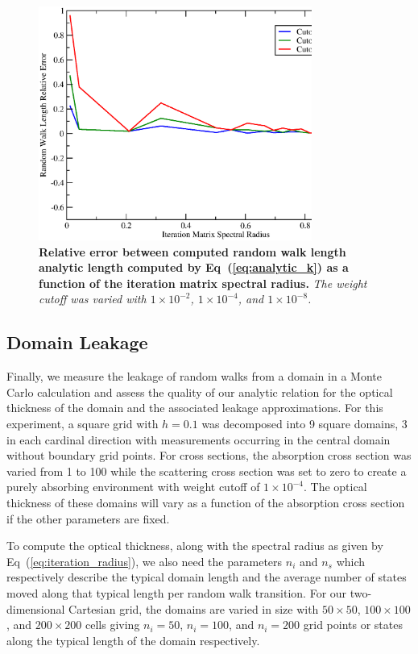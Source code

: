 \documentclass[preprint,11pt]{elsarticle}
\newcommand{\sn}[2]{\ensuremath{#1\times 10^{#2}}}
\begin{document}
\begin{figure}[ht!]
  \begin{center}
    \includegraphics[width=0.8\textwidth]{random_walk_error.eps}
  \end{center}
  \caption{\textbf{Relative error between computed random walk length analytic
      length computed by Eq~(\ref{eq:analytic_k}) as a function of the
      iteration matrix spectral radius.} \textit{The weight cutoff was varied
      with \sn{1}{-2}, \sn{1}{-4}, and \sn{1}{-8}.}}
  \label{fig:measured_length_error}
\end{figure}

\subsection{Domain Leakage}
\label{subsec:domain_leakage}

Finally, we measure the leakage of random walks from a domain in a Monte Carlo
calculation and assess the quality of our analytic relation for the optical
thickness of the domain and the associated leakage approximations. For this
experiment, a square grid with $h=0.1$ was decomposed into 9 square domains, 3
in each cardinal direction with measurements occurring in the central domain
without boundary grid points. For cross sections, the absorption cross section
was varied from 1 to 100 while the scattering cross section was set to zero to
create a purely absorbing environment with weight cutoff of \sn{1}{-4}. The
optical thickness of these domains will vary as a function of the absorption
cross section if the other parameters are fixed.

To compute the optical thickness, along with the spectral radius as given by
Eq~(\ref{eq:iteration_radius}), we also need the parameters $n_i$ and $n_s$
which respectively describe the typical domain length and the average number
of states moved along that typical length per random walk transition. For our
two-dimensional Cartesian grid, the domains are varied in size with $50 \times
50$, $100 \times 100$, and $200 \times 200$ cells giving $n_i=50$, $n_i=100$,
and $n_i=200$ grid points or states along the typical length of the domain
respectively.
\end{document}
